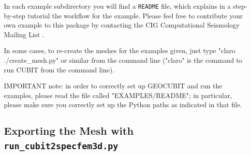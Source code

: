In each example subdirectory you will find a \texttt{README} file,
which explains in a step-by-step tutorial the workflow for the example.
Please feel free to contribute your own example to this package by
contacting the CIG Computational Seismology Mailing List .

In some cases, to re-create the meshes for the examples given, just type "claro ./create\_mesh.py" or similar
from the command line ("claro" is the command to run CUBIT from the command line).

IMPORTANT note: in order to correctly set up GEOCUBIT and run the examples, please read the file called "EXAMPLES/README";
in particular, please make sure you correctly set up the Python paths as indicated in that file.


\subsection{Exporting the Mesh with \texttt{run\_cubit2specfem3d.py} }\label{subsec:Exporting-the-Mesh}

